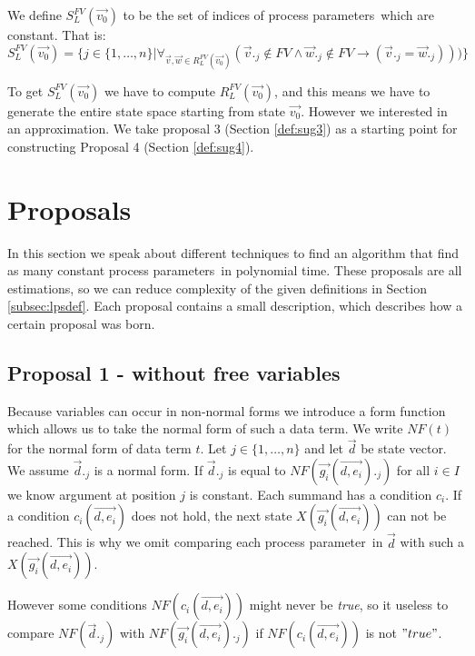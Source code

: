 \index{}\documentclass[a4paper,10pt]{article}
\theoremstyle{plain}
\theoremstyle{definition}
\newcommand{\ovr}{\overrightarrow}
\newcommand{\pp}{process parameter}
\newcommand{\pps}{process parameters}
\newcommand{\ti}{\textit}
\begin{document}
\begin{defn}\label{def:lps_comp_fv} We define $S_L^{FV}(\ovr{v_0})$ to be the set of indices of \pps\ which are constant. That is:\\

$S_L^{FV}(\ovr{v_0}) = \lbrace j \in  \lbrace 1, \ldots, n \rbrace \vert \forall_{\ovr{v}, \ovr{w} \in R_L^{FV}(\ovr{v_0})}( \ovr{v}._j \not\in FV \wedge \ovr{w}._j \not\in FV \rightarrow ( \ovr{v}._j = \ovr{w}._j)))
\rbrace $
\end{defn}

To get $S_L^{FV} (\ovr{v_0})$ we have to compute $R_L^{FV}(\ovr{v_0})$, and this means we have to generate the entire state space starting from state $\ovr{v_0}$. However we interested in an approximation. We take proposal 3 (Section \ref{def:sug3}) as a starting point for constructing Proposal 4 (Section \ref{def:sug4}).

\section{Proposals}
In this section we speak about different techniques to find an algorithm that find as many constant \pps\ in polynomial time. These proposals are all estimations, so we can reduce complexity of the given definitions in Section \ref{subsec:lpsdef}. Each proposal contains a small description, which describes how a certain proposal was born.

\subsection{Proposal 1 - without free variables} \label{sec:prop1}
Because variables can occur in non-normal forms we introduce a form function which allows us to take the normal form of such a data term.
We write $NF(t)$ for the normal form of data term $t$.
Let $j \in \lbrace 1, \ldots,  n \rbrace $ and let $\ovr{d}$ be state vector. We assume $\ovr{d}._j$ is a normal form. If $\ovr{d}._j$ is equal to $NF(\ovr{g_i}(\ovr{d,e_i})._j)$ for all $i \in I$ we know argument at position $j$ is constant. Each summand has a condition $c_i$. If a condition $c_i(\ovr{d, e_i})$ does not hold, the next state $X(\ovr{g_i}(\ovr{d, e_i}))$ can not be reached. This is why we omit comparing each \pp\ in $\ovr{d} $ with such a $X(\ovr{g_i}(\ovr{d, e_i}))$.

 However some conditions $NF(c_i(\ovr{d,e_i}))$ might never be \ti{true}, so it useless to compare $NF(\ovr{d}._j)$ with $NF(\ovr{g_i}(\ovr{d,e_i})._j)$  if $NF(c_i(\ovr{d,e_i}))$ is not  $"true"$. \\
\end{document}
